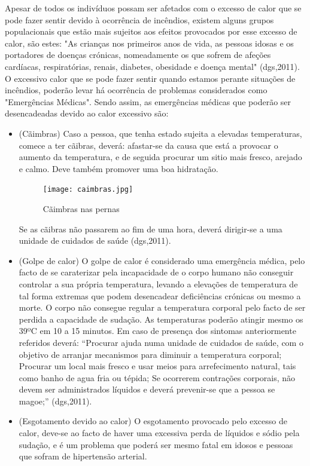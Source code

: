 \documentclass{report}
\begin{document}
Apesar de todos os indivíduos possam ser afetados com o excesso de calor que se pode fazer sentir devido à ocorrência de incêndios, existem alguns grupos populacionais que estão mais sujeitos aos efeitos provocados por esse excesso de calor, são estes: "As crianças nos primeiros anos de vida, as pessoas idosas e os portadores de doenças crónicas, nomeadamente os que sofrem de afeções cardíacas, respiratórias, renais, diabetes, obesidade e doença mental" (\ac{dgs},2011).
O excessivo calor que se pode fazer sentir quando estamos perante situações de incêndios, poderão levar há ocorrência de problemas considerados como "Emergências Médicas". Sendo assim, as emergências médicas que poderão ser desencadeadas devido ao calor excessivo são:

\begin{itemize}
\item (Cãimbras) Caso a pessoa, que tenha estado sujeita a elevadas temperaturas, comece a ter cãibras, deverá: afastar-se da causa que está a provocar o aumento da temperatura, e de seguida procurar um sitio mais fresco, arejado e calmo. Deve também promover uma boa hidratação.

\begin{figure}[H]
\center
\texttt{[image: caimbras.jpg]}
\caption{Cãimbras nas pernas}
\end{figure}

Se as cãibras não passarem ao fim de uma hora, deverá dirigir-se a uma unidade de cuidados de saúde (\ac{dgs},2011).

\item (Golpe de calor) O golpe de calor é considerado uma emergência médica, pelo facto de se caraterizar pela incapacidade de o corpo humano não conseguir controlar a sua própria temperatura, levando a elevações de temperatura de tal forma extremas que podem desencadear deficiências crónicas ou mesmo a morte. O corpo não consegue regular a temperatura corporal pelo facto de ser perdida a capacidade de sudação. As temperaturas poderão atingir mesmo os 39ºC em 10 a 15 minutos.
Em caso de presença dos sintomas anteriormente referidos deverá: “Procurar ajuda numa unidade de cuidados de saúde, com o objetivo de arranjar mecanismos para diminuir a temperatura corporal; Procurar um local mais fresco e usar meios para arrefecimento natural, tais como banho de agua fria ou tépida; Se ocorrerem contrações corporais, não devem ser administrados líquidos e deverá prevenir-se que a pessoa se magoe;” (\ac{dgs},2011).

\item (Esgotamento devido ao calor) O esgotamento provocado pelo excesso de calor, deve-se ao facto de haver uma excessiva perda de líquidos e sódio pela sudação, e é um problema que poderá ser mesmo fatal em idosos e pessoas que sofram de hipertensão arterial.


\end{itemize}
\end{document}
